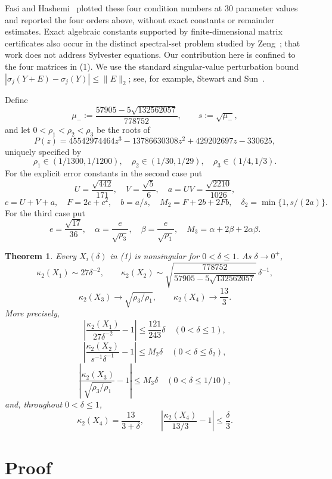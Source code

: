 \documentclass[11pt]{article}
\newtheorem{theorem}{Theorem}
\newcommand{\norm}[1]{\lVert#1\rVert_2}
\begin{document}
Fasi and Hashemi~\cite{FasiHashemi2026} plotted these four condition numbers
at 30 parameter values and reported the four orders above, without exact
constants or remainder estimates.  Exact algebraic constants supported by
finite-dimensional matrix certificates also occur in the distinct
spectral-set problem studied by Zeng~\cite{Zeng2026ConvexLens}; that work does
not address Sylvester equations.  Our contribution here is confined to the
four matrices in (1).  We use the standard singular-value perturbation bound
$|\sigma_j(Y+E)-\sigma_j(Y)|\leq\norm{E}$; see, for example,
Stewart and Sun~\cite[Theorem~IV.4.11]{StewartSun1990}.

Define
\[
\mu_-:=\frac{57905-5\sqrt{132562057}}{778752},\qquad s:=\sqrt{\mu_-},
\tag{2}
\]
and let $0<\rho_1<\rho_2<\rho_3$ be the roots of
\[
P(z)=45542974464z^3-13786630308z^2+429202697z-330625,
\tag{3}
\]
uniquely specified by
\[
\rho_1\in(1/1300,1/1200),\quad
\rho_2\in(1/30,1/29),\quad
\rho_3\in(1/4,1/3).
\tag{4}
\]
For the explicit error constants in the second case put
\[
U=\frac{\sqrt{442}}{171},\quad V=\frac{\sqrt5}{6},\quad
a=UV=\frac{\sqrt{2210}}{1026},
\]
\[
c=U+V+a,\quad F=2c+c^2,\quad b=a/s,
\quad M_2=F+2b+2Fb,\quad
\delta_2=\min\{1,s/(2a)\}.
\tag{5}
\]
For the third case put
\[
e=\frac{\sqrt{17}}{36},\quad
\alpha=\frac{e}{\sqrt{\rho_3}},\quad
\beta=\frac{e}{\sqrt{\rho_1}},\quad
M_3=\alpha+2\beta+2\alpha\beta.
\tag{6}
\]

\begin{theorem}
Every $X_i(\delta)$ in (1) is nonsingular for $0<\delta\leq1$.  As
$\delta\to0^+$,
\[
\kappa_2(X_1)\sim27\delta^{-2},\qquad
\kappa_2(X_2)\sim
\sqrt{\frac{778752}{57905-5\sqrt{132562057}}}\,\delta^{-1},
\tag{7}
\]
\[
\kappa_2(X_3)\longrightarrow\sqrt{\rho_3/\rho_1},
\qquad
\kappa_2(X_4)\longrightarrow\frac{13}{3}.
\tag{8}
\]
More precisely,
\[
\left|\frac{\kappa_2(X_1)}{27\delta^{-2}}-1\right|
 \leq\frac{121}{243}\delta
\quad(0<\delta\leq1),
\tag{9}
\]
\[
\left|\frac{\kappa_2(X_2)}{s^{-1}\delta^{-1}}-1\right|
 \leq M_2\delta
\quad(0<\delta\leq\delta_2),
\tag{10}
\]
\[
\left|\frac{\kappa_2(X_3)}{\sqrt{\rho_3/\rho_1}}-1\right|
 \leq M_3\delta
\quad(0<\delta\leq1/10),
\tag{11}
\]
and, throughout $0<\delta\leq1$,
\[
\kappa_2(X_4)=\frac{13}{3+\delta},\qquad
\left|\frac{\kappa_2(X_4)}{13/3}-1\right|\leq\frac\delta3.
\tag{12}
\]
\end{theorem}

\section{Proof}
\end{document}
